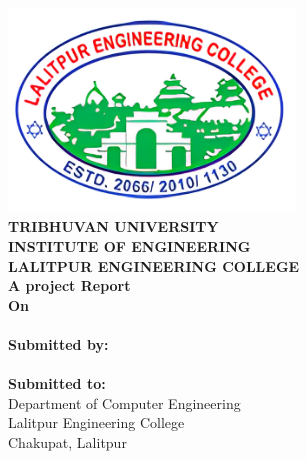 \begin{center}

    \thispagestyle{empty}

    \includegraphics[width= 3in ]{img/leclogo21.png} \\
    \vspace{0.05 in}
    {\fontsize{12 pt}{12} \selectfont\textbf{TRIBHUVAN UNIVERSITY} \\
        \textbf{INSTITUTE OF ENGINEERING} \\
        \textbf{LALITPUR ENGINEERING COLLEGE}} \\

    \vspace{0.5 in}
    \textbf{A project Report}\\
    {\fontsize{12 pt}{12} \selectfont\textbf{On}\\}
    {\fontsize{12 pt}{12} \selectfont \textbf{\thetitle}}\\
    \vspace{0.8 in}
    \textbf{ Submitted by:}  \\
    {\theauthor} \\
    \vspace{0.8 in}
    \textbf{ Submitted to:}  \\
    Department of Computer Engineering \\
    Lalitpur Engineering College \\
    Chakupat, Lalitpur \\
    \vspace{0.7 in}
    \thedate
\end{center}